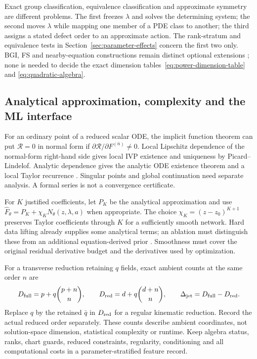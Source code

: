 \documentclass[11pt]{article}
\theoremstyle{definition}
\begin{document}
Exact group classification, equivalence classification and approximate
symmetry are different problems. The first freezes $\lambda$ and solves the
determining system; the second moves $\lambda$ while mapping one member of a
PDE class to another; the third assigns a stated defect order to an
approximate action. The rank-stratum and equivalence tests in
Section~\ref{sec:parameter-effects} concern the first two only. BGI, FS and
nearby-equation constructions remain distinct optional extensions
\cite{kovalev,tarayrah2023,approxalg}; none is needed to decide the exact
dimension tables~\eqref{eq:power-dimension-table} and
\eqref{eq:quadratic-algebra}.

\subsection{Analytical approximation, complexity and the ML interface}
\label{sec:complexity-core}
For an ordinary point of a reduced scalar ODE, the implicit function theorem
can put $\mathcal R=0$ in normal form if
$\partial\mathcal R/\partial F^{(\bar n)}\ne0$. Local Lipschitz dependence
of the normal-form right-hand side gives local IVP existence and uniqueness
by Picard--Lindelof. Analytic dependence gives the analytic ODE existence
theorem and a local Taylor recurrence \cite{teschl2012}. Singular points and global continuation
need separate analysis. A formal series is not a convergence certificate.

For $K$ justified coefficients, let $P_K$ be the analytical approximation and
use $\widehat F_\theta=P_K+\chi_KN_\theta(z,\lambda,a)$ when appropriate.
The choice $\chi_K=(z-z_0)^{K+1}$ preserves Taylor coefficients through $K$
for a sufficiently smooth network. Hard data lifting already supplies some
analytical terms; an ablation must distinguish these from an additional
equation-derived prior \cite{lagaris}. Smoothness must cover the original
residual derivative budget and the derivatives used by optimization.

For a transverse reduction retaining $q$ fields, exact ambient counts at the
same order $n$ are
\begin{equation}
 D_{\rm full}=p+q\binom{p+n}{n},\qquad
 D_{\rm red}=d+q\binom{d+n}{n},\qquad
 \Delta_{\rm jet}=D_{\rm full}-D_{\rm red}.
 \label{eq:fundamental-jet-count}
\end{equation}
Replace $q$ by the retained $\bar q$ in $D_{\rm red}$ for a regular kinematic
reduction. Record the actual reduced order separately. These counts describe
ambient coordinates, not solution-space dimension, statistical complexity or
runtime. Keep algebra status, ranks, chart guards, reduced constraints,
regularity, conditioning and all computational costs in a parameter-stratified
feature record.
\end{document}
